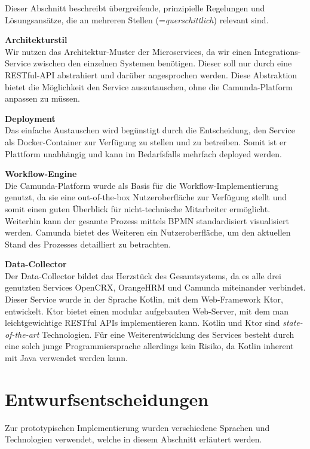 \documentclass[]{article}
\begin{document}
Dieser Abschnitt beschreibt übergreifende, prinzipielle Regelungen und
Lösungsansätze, die an mehreren Stellen (=\emph{querschittlich})
relevant sind.

\textbf{Architekturstil}\\
Wir nutzen das Architektur-Muster der Microservices, da wir einen Integrations-Service zwischen den einzelnen Systemen benötigen.
Dieser soll nur durch eine RESTful-API abstrahiert und darüber angesprochen werden.
Diese Abstraktion bietet die Möglichkeit den Service auszutauschen, ohne die Camunda-Platform anpassen zu müssen. 

\textbf{Deployment}\\
Das einfache Austauschen wird begünstigt durch die Entscheidung, den Service als Docker-Container zur Verfügung zu stellen und zu betreiben.
Somit ist er Plattform unabhängig und kann im Bedarfsfalls mehrfach deployed werden.

\textbf{Workflow-Engine}\\
Die Camunda-Platform wurde als Basis für die Workflow-Implementierung genutzt, da sie eine out-of-the-box Nutzeroberfläche zur Verfügung stellt und somit einen guten Überblick für nicht-technische Mitarbeiter ermöglicht.
Weiterhin kann der gesamte Prozess mittels BPMN standardisiert visualisiert werden. Camunda bietet des Weiteren ein Nutzeroberfläche, um den aktuellen Stand des Prozesses detailliert zu betrachten.

\textbf{Data-Collector}\\
Der Data-Collector bildet das Herzstück des Gesamtsystems, da es alle drei genutzten Services OpenCRX, OrangeHRM und Camunda miteinander verbindet.
Dieser Service wurde in der Sprache Kotlin, mit dem Web-Framework Ktor, entwickelt. 
Ktor bietet einen modular aufgebauten Web-Server, mit dem man leichtgewichtige RESTful APIs implementieren kann.
Kotlin und Ktor sind \emph{state-of-the-art} Technologien.
Für eine Weiterentwicklung des Services besteht durch eine solch junge Programmiersprache allerdings kein Risiko, da Kotlin inherent mit Java verwendet werden kann.

\hypertarget{section-design-decisions}{%
\section{Entwurfsentscheidungen}\label{section-design-decisions}}

Zur prototypischen Implementierung wurden verschiedene Sprachen und Technologien verwendet, welche in diesem Abschnitt erläutert werden.
\end{document}
